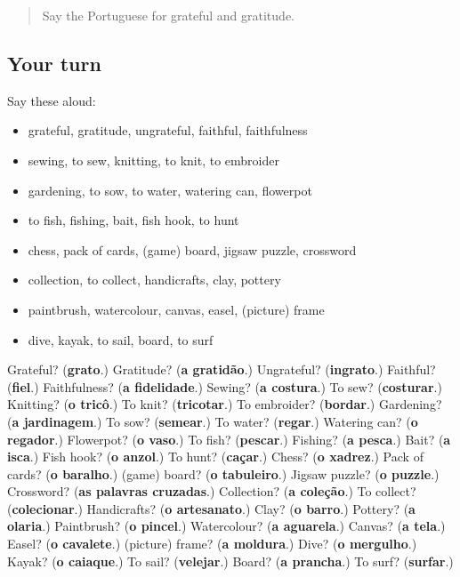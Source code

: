\begin{quote}
Say the Portuguese for grateful and gratitude.
\end{quote}

\subsection*{Your turn}
Say these aloud:

\begin{itemize}
\raggedright
  \item grateful, gratitude, ungrateful, faithful, faithfulness
  \item sewing, to sew, knitting, to knit, to embroider
  \item gardening, to sow, to water, watering can, flowerpot
  \item to fish, fishing, bait, fish hook, to hunt
  \item chess, pack of cards, (game) board, jigsaw puzzle, crossword
  \item collection, to collect, handicrafts, clay, pottery
  \item paintbrush, watercolour, canvas, easel, (picture) frame
  \item dive, kayak, to sail, board, to surf
\end{itemize}

\begin{tcolorbox}[breakable,colback=teal!4,colframe=teal!35!black,title={Before you move on}]
Grateful? (\textbf{grato}.) Gratitude? (\textbf{a gratidão}.) Ungrateful? (\textbf{ingrato}.) Faithful? (\textbf{fiel}.) Faithfulness? (\textbf{a fidelidade}.) Sewing? (\textbf{a costura}.) To sew? (\textbf{costurar}.) Knitting? (\textbf{o tricô}.) To knit? (\textbf{tricotar}.) To embroider? (\textbf{bordar}.) Gardening? (\textbf{a jardinagem}.) To sow? (\textbf{semear}.) To water? (\textbf{regar}.) Watering can? (\textbf{o regador}.) Flowerpot? (\textbf{o vaso}.) To fish? (\textbf{pescar}.) Fishing? (\textbf{a pesca}.) Bait? (\textbf{a isca}.) Fish hook? (\textbf{o anzol}.) To hunt? (\textbf{caçar}.) Chess? (\textbf{o xadrez}.) Pack of cards? (\textbf{o baralho}.) (game) board? (\textbf{o tabuleiro}.) Jigsaw puzzle? (\textbf{o puzzle}.) Crossword? (\textbf{as palavras cruzadas}.) Collection? (\textbf{a coleção}.) To collect? (\textbf{colecionar}.) Handicrafts? (\textbf{o artesanato}.) Clay? (\textbf{o barro}.) Pottery? (\textbf{a olaria}.) Paintbrush? (\textbf{o pincel}.) Watercolour? (\textbf{a aguarela}.) Canvas? (\textbf{a tela}.) Easel? (\textbf{o cavalete}.) (picture) frame? (\textbf{a moldura}.) Dive? (\textbf{o mergulho}.) Kayak? (\textbf{o caiaque}.) To sail? (\textbf{velejar}.) Board? (\textbf{a prancha}.) To surf? (\textbf{surfar}.)
\end{tcolorbox}
